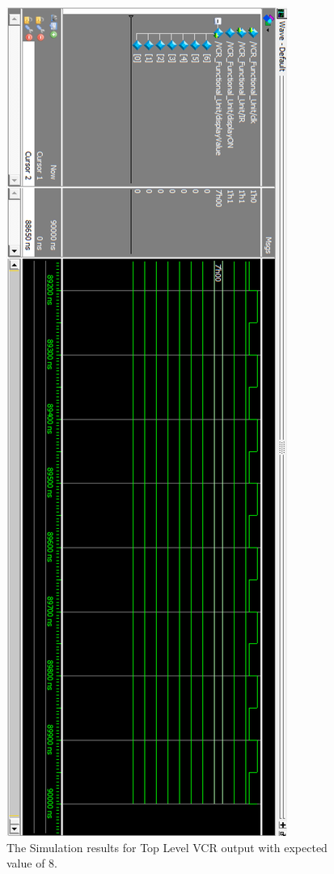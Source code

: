 \documentclass[a4paper]{article}
\begin{document}
\begin{figure}[t]
  \centering
  \includegraphics[height=.98\textheight]{sims/vcr_testing/functionalUnitTest/FunctionalUnitTest_8.png}
  \caption{The Simulation results for Top Level VCR output with expected value of 8.}
  \label{fig:top-level-block-1}
\end{figure}
\end{document}
